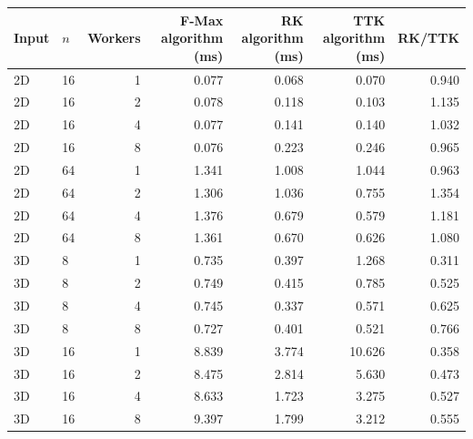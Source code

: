 \begin{tabular}{llrrrrr}
\hline
Input & $n$ & Workers & F-Max algorithm (ms) & RK algorithm (ms) & TTK algorithm (ms) & RK/TTK \\
\hline
2D & 16 & 1 & 0.077 & 0.068 & 0.070 & 0.940 \\
2D & 16 & 2 & 0.078 & 0.118 & 0.103 & 1.135 \\
2D & 16 & 4 & 0.077 & 0.141 & 0.140 & 1.032 \\
2D & 16 & 8 & 0.076 & 0.223 & 0.246 & 0.965 \\
2D & 64 & 1 & 1.341 & 1.008 & 1.044 & 0.963 \\
2D & 64 & 2 & 1.306 & 1.036 & 0.755 & 1.354 \\
2D & 64 & 4 & 1.376 & 0.679 & 0.579 & 1.181 \\
2D & 64 & 8 & 1.361 & 0.670 & 0.626 & 1.080 \\
3D & 8 & 1 & 0.735 & 0.397 & 1.268 & 0.311 \\
3D & 8 & 2 & 0.749 & 0.415 & 0.785 & 0.525 \\
3D & 8 & 4 & 0.745 & 0.337 & 0.571 & 0.625 \\
3D & 8 & 8 & 0.727 & 0.401 & 0.521 & 0.766 \\
3D & 16 & 1 & 8.839 & 3.774 & 10.626 & 0.358 \\
3D & 16 & 2 & 8.475 & 2.814 & 5.630 & 0.473 \\
3D & 16 & 4 & 8.633 & 1.723 & 3.275 & 0.527 \\
3D & 16 & 8 & 9.397 & 1.799 & 3.212 & 0.555 \\
\hline
\end{tabular}
